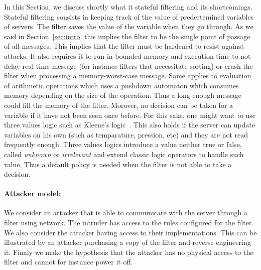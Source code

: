 In this Section, we discuss shortly what it stateful filtering and its
shortcomings.
Stateful filtering consists in keeping track of the value of predertemined
variables of servers.
The filter saves the value of the variable when they go through.
As we said in Section~\ref{sec:intro} this implies the filter to be the single
point of passage of all messages.
This implies that the filter must be hardened to resist against attacks.
It also requires it to run in bounded memory and execution time to not delay
real time message (for instance filters that necessitate sorting) or crash the
filter when processing a memory-worst-case message.
Same applies to evaluation of arithmetic operations which uses a pushdown
automaton which consumes memory depending on the size of the operation.
Thus a long enough message could fill the memory of the filter.
%
Morover, no decision can be taken for a variable if it have not been seen once
before.
For this sake, one might want to use three values logic such as Kleene's
logic~\cite{Kle52}.
This also holds if the server can update variables on his own (such as
temparature, pression, etc) and they are not read frequently enough.
Three values logics introduce a value neither true or false, called
{\em unknown} or {\em irrelevant} and extend classic logic operators to handle
such value.
Thus a default policy is needed when the filter is not able to take a decision.

\paragraph{Attacker model:} We consider an attacker that is able to communicate
with the server through a filter using network.
The intruder has access to the rules configured for the filter.
We also consider the attacker having access to their implementations.
This can be illustrated by an attacker purchasing a copy of the filter and
reverse engineering it.
Finaly we make the hypothesis that the attacker has no physical access to the
filter and cannot for instance power it off.
